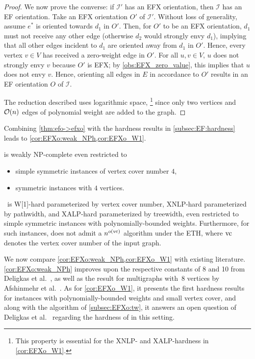 \begin{proof}
    We now prove the converse: if $\mathcal{I}'$ has an EFX orientation, then $\mathcal{I}$ has an EF orientation. Take an EFX orientation $O'$ of $\mathcal{I}'$. Without loss of generality, assume $e^*$ is oriented towards $d_1$ in $O'$. Then, for $O'$ to be an EFX orientation, $d_1$ must not receive any other edge (otherwise $d_2$ would strongly envy $d_1$), implying that all other edges incident to $d_1$ are oriented away from $d_1$ in $O'$. Hence, every vertex $v\in V$ has received a zero-weight edge in $O'$. For all $u,v\in V$, $u$ does not strongly envy $v$ because $O'$ is EFX; by \cref{obs:EFX_zero_value}, this implies that $u$ does not envy $v$. Hence, orienting all edges in $E$ in accordance to $O'$ results in an EF orientation $O$ of $\mathcal{I}$.

    The reduction described uses logarithmic space,%
    \footnote{This property is essential for the XNLP- and XALP-hardness in \cref{cor:EFXo_W1}.}
    since only two vertices and $\mathcal{O}(n)$ edges of polynomial weight are added to the graph.
\end{proof}

Combining \cref{thm:efo->efxo} with the hardness results in \cref{subsec:EF:hardness} leads to \cref{cor:EFXo:weak_NPh,cor:EFXo_W1}.

\begin{corollary}\label{cor:EFXo:weak_NPh}
    {\EFXo} is weakly NP-complete even restricted to
    \begin{itemize}
        \item simple symmetric instances of vertex cover number $4$,
        \item symmetric instances with $4$ vertices.
    \end{itemize}
\end{corollary}

\begin{corollary}\label{cor:EFXo_W1}
    \EFXo\ is  W[1]-hard parameterized by vertex cover number,
    XNLP-hard parameterized by pathwidth,
    and XALP-hard parameterized by treewidth,
    even restricted to simple symmetric instances with polynomially-bounded weights.
    Furthermore, for such instances, {\EFXo} does not admit a $n^{o(\mathrm{vc})}$ algorithm under the ETH,
    where $\mathrm{vc}$ denotes the vertex cover number of the input graph.
\end{corollary}

We now compare \cref{cor:EFXo:weak_NPh,cor:EFXo_W1} with existing literature.
\cref{cor:EFXo:weak_NPh} improves upon the respective constants of 8 and 10 from Deligkas et al.~\cite{ijcai/DeligkasEGK25}, as well as the result for multigraphs with~8 vertices by Afshinmehr et al.~\cite{AfshinmehrDKMR25}.
As for \cref{cor:EFXo_W1}, it presents the first hardness results for instances with polynomially-bounded weights and small vertex cover,
and along with the algorithm of \cref{subsec:EFXo:tw}, it answers an open question of Deligkas et al.~\cite{ijcai/DeligkasEGK25} regarding the hardness of {\EFXo} in this setting.


